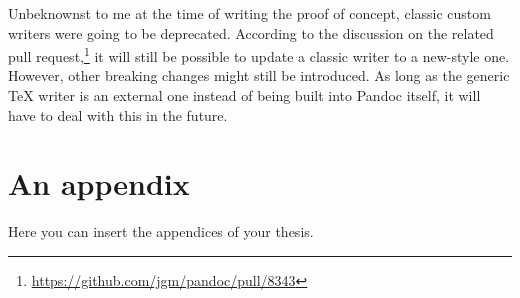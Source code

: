 \documentclass[
  digital,     %
  oneside,     %
  nosansbold,  %
  nocolorbold, %
  lof,         %
  nolot,       %
]{fithesis4}
\begin{document}
Unbeknownst to me at the time of writing the proof of concept, classic custom writers were going to be deprecated. According to the discussion on the related pull request,\footnote{\url{https://github.com/jgm/pandoc/pull/8343}} it will still be possible to update a classic writer to a new-style one. However, other breaking changes might still be introduced. As long as the generic \TeX{} writer is an external one instead of being built into Pandoc itself, it will have to deal with this in the future.

\printbibliography[heading=bibintoc] %

\makeatletter\thesis@blocks@clear\makeatother
{} %
\printindex

\appendix %
\chapter{An appendix}
Here you can insert the appendices of your thesis.
\end{document}
